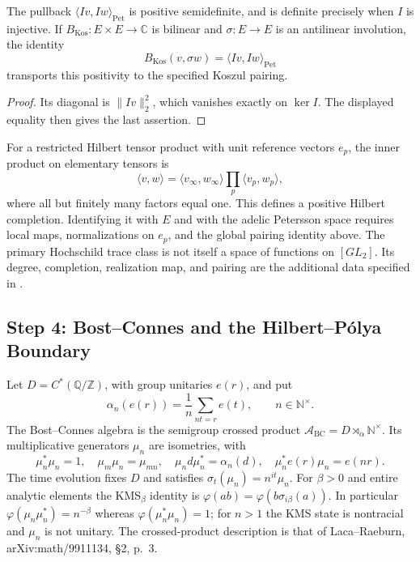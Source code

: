 \begin{theorem}
\label{v4-arith:w5-direct:thm:P3-elementary}
The pullback $\langle Iv,Iw\rangle_{\mathrm{Pet}}$ is positive
semidefinite, and is definite precisely when $I$ is injective.
If $B_{\mathrm{Kos}}:E\times E\to\mathbb C$ is bilinear and
$\sigma:E\to E$ is an antilinear involution, the identity
\[
 B_{\mathrm{Kos}}(v,\sigma w)=\langle Iv,Iw\rangle_{\mathrm{Pet}}
\]
transports this positivity to the specified Koszul pairing.
\end{theorem}
\begin{proof}
Its diagonal is $\|Iv\|_2^2$, which vanishes exactly on $\ker I$.
The displayed equality then gives the last assertion.
\end{proof}

\begin{remark}
\label{v4-arith:w5-direct:rem:P3-elementary}
For a restricted Hilbert tensor product with unit reference vectors
$e_p$, the inner product on elementary tensors is
\begin{equation}
\label{v4-arith:w5-direct:eq:petersson-factorized}
 \langle v,w\rangle=\langle v_\infty,w_\infty\rangle
 \prod_p\langle v_p,w_p\rangle,
\end{equation}
where all but finitely many factors equal one.
This defines a positive Hilbert completion. Identifying it with
$E$ and with the adelic Petersson space requires local maps,
normalizations on $e_p$, and the global pairing identity above.
The primary Hochschild trace class is not itself a space of
functions on $[GL_2]$. Its degree, completion, realization map,
and pairing are the additional data specified in
.
\end{remark}
\subsection{Step 4: Bost--Connes and the Hilbert--P\'olya Boundary}
\label{v4-arith:w5-direct:step-4}

\begin{definition}
\label{v4-arith:w5-direct:def:BC}
Let $D=C^*(\mathbb Q/\mathbb Z)$, with group unitaries $e(r)$,
and put
\[
 \alpha_n(e(r))=\frac1n\sum_{nt=r}e(t),\qquad n\in\mathbb N^\times.
\]
The Bost--Connes algebra is the semigroup crossed product
$\mathcal A_{\mathrm{BC}}=D\rtimes_\alpha\mathbb N^\times$.
Its multiplicative generators $\mu_n$ are isometries, with
\[
 \mu_n^*\mu_n=1,\quad \mu_m\mu_n=\mu_{mn},\quad
 \mu_n d\mu_n^*=\alpha_n(d),\quad
 \mu_n^*e(r)\mu_n=e(nr).
\]
The time evolution fixes $D$ and satisfies
$\sigma_t(\mu_n)=n^{it}\mu_n$.
For $\beta>0$ and entire analytic elements the KMS$_\beta$ identity is
$\varphi(ab)=\varphi(b\sigma_{i\beta}(a))$.
In particular
$\varphi(\mu_n\mu_n^*)=n^{-\beta}$ whereas
$\varphi(\mu_n^*\mu_n)=1$; for $n>1$ the KMS state is nontracial
and $\mu_n$ is not unitary.
The crossed-product description is that of Laca--Raeburn,
arXiv:math/9911134, \S2, p.~3.
\end{definition}

